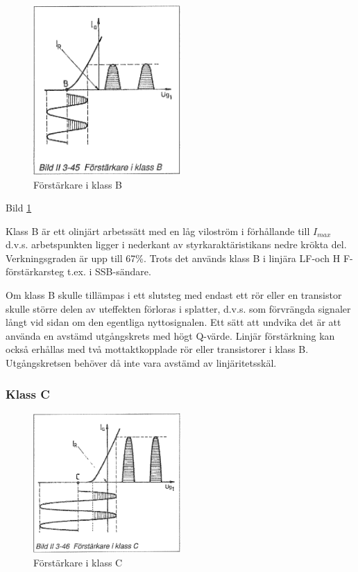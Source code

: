 \begin{figure}
\includegraphics[width=0.5\textwidth]{images/bild_2_3-45}
\caption{Förstärkare i klass B}
\label{fig:BildII3-45}
\end{figure}

Bild \ref{fig:BildII3-45}

Klass B är ett olinjärt arbetssätt med en låg viloström i förhållande
till \(I_{max}\) d.v.s. arbetspunkten ligger i nederkant av
styrkaraktäristikans nedre krökta del. Verkningsgraden är upp till
67\%. Trots det används klass B i linjära LF-och H F-förstärkarsteg
t.ex. i SSB-sändare.

Om klass B skulle tillämpas i ett slutsteg med endast ett rör eller en
transistor skulle större delen av uteffekten förloras i splatter,
d.v.s. som förvrängda signaler långt vid sidan om den egentliga
nyttosignalen. Ett sätt att undvika det är att använda en avstämd
utgångskrets med högt Q-värde. Linjär förstärkning kan också erhållas
med två mottaktkopplade rör eller transistorer i klass B.
Utgångskretsen behöver då inte vara avstämd av linjäritetsskäl.

\subsubsection{Klass C}

\begin{figure}
\includegraphics[width=0.5\textwidth]{images/bild_2_3-46}
\caption{Förstärkare i klass C}
\label{fig:BildII3-46}
\end{figure}

